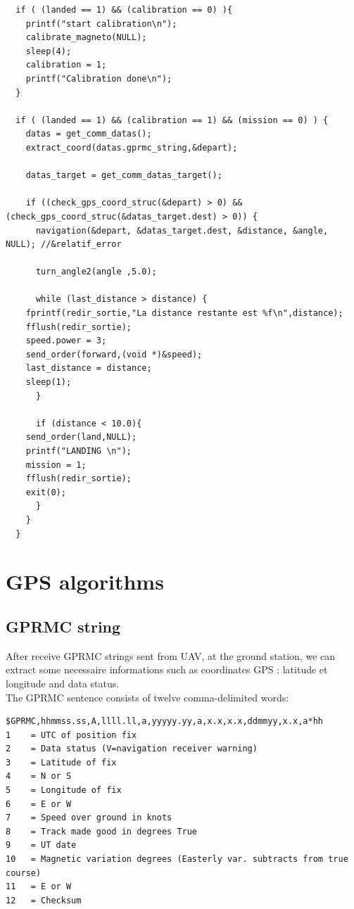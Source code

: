 \begin{lstlisting}
  if ( (landed == 1) && (calibration == 0) ){
    printf("start calibration\n");
    calibrate_magneto(NULL);
    sleep(4);
    calibration = 1;
    printf("Calibration done\n");
  }

  if ( (landed == 1) && (calibration == 1) && (mission == 0) ) {	  
    datas = get_comm_datas();	
    extract_coord(datas.gprmc_string,&depart);

    datas_target = get_comm_datas_target();
	
    if ((check_gps_coord_struc(&depart) > 0) && (check_gps_coord_struc(&datas_target.dest) > 0)) {
      navigation(&depart, &datas_target.dest, &distance, &angle, NULL); //&relatif_error
	
      turn_angle2(angle ,5.0);
	
      while (last_distance > distance) {
	fprintf(redir_sortie,"La distance restante est %f\n",distance);
	fflush(redir_sortie);
	speed.power = 3;
	send_order(forward,(void *)&speed);
	last_distance = distance;
	sleep(1);
      }

      if (distance < 10.0){
	send_order(land,NULL); 
	printf("LANDING \n");
	mission = 1;
	fflush(redir_sortie);
	exit(0);
      }	
    }
  }
\end{lstlisting}

\section{GPS algorithms}

\subsection{GPRMC string}
After receive GPRMC strings sent from UAV, at the ground station, we can extract some necessaire informations such as coordinates GPS : latitude et longitude and data status.\\

The GPRMC sentence consists of twelve comma-delimited words:\\

\begin{verbatim}
$GPRMC,hhmmss.ss,A,llll.ll,a,yyyyy.yy,a,x.x,x.x,ddmmyy,x.x,a*hh
1    = UTC of position fix
2    = Data status (V=navigation receiver warning)
3    = Latitude of fix
4    = N or S
5    = Longitude of fix
6    = E or W
7    = Speed over ground in knots
8    = Track made good in degrees True
9    = UT date
10   = Magnetic variation degrees (Easterly var. subtracts from true course)
11   = E or W
12   = Checksum
\end{verbatim}

